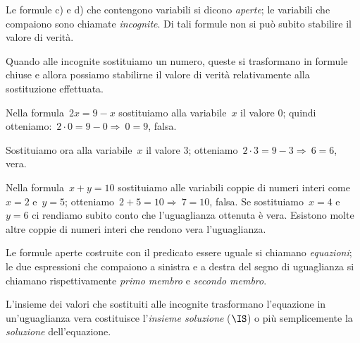 Le formule c) e d) che contengono variabili si dicono \emph{aperte}; le variabili che compaiono sono chiamate
\emph{incognite}. Di tali formule non si può subito stabilire il valore di verità.

Quando alle incognite sostituiamo un numero, queste si trasformano in
formule chiuse e allora possiamo stabilirne il valore di verità
relativamente alla sostituzione effettuata.

\begin{exrig}
 \begin{esempio}
 Nella formula~$2x = 9 - x$ sostituiamo alla variabile~$x$ il valore $0$; quindi otteniamo:~$2\cdot 0=9-0 \Rightarrow~0=9$, falsa.

 Sostituiamo ora alla
variabile~$x$ il valore $3$; otteniamo~$2\cdot 3=9-3 \Rightarrow~6=6$, vera.
 \end{esempio}

 \begin{esempio}
 Nella formula~$x + y = 10$ sostituiamo
alle variabili coppie di numeri interi come~$x = 2$ e~$y = 5$; otteniamo~$2+5=10\Rightarrow~7= 10$, falsa. Se
sostituiamo~$x = 4$ e~$y = 6$ ci rendiamo subito conto che
l'uguaglianza ottenuta è vera. Esistono
molte altre coppie di numeri interi che rendono vera
l'uguaglianza.
 \end{esempio}
\end{exrig}

\begin{definizione}
 Le formule aperte costruite con il predicato essere uguale si chiamano
\emph{equazioni}; le due espressioni che compaiono a sinistra e a
destra del segno di uguaglianza si chiamano rispettivamente
\emph{primo membro} e \emph{secondo membro}.

L'insieme dei valori che sostituiti alle incognite trasformano l'equazione in
un'uguaglianza vera costituisce
l'\emph{insieme soluzione} ($\IS$) o più semplicemente la \emph{soluzione} dell'equazione.
\end{definizione}

